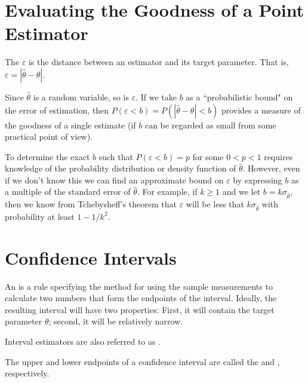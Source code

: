 \documentclass[12pt, a4paper, twoside, openright, titlepage]{book}
\begin{document}
\section{\textsection Evaluating the Goodness of a Point Estimator}

\begin{defn}{}{}
    The  $\varepsilon$ is the distance between an estimator and its target parameter. That is, $\varepsilon = |\hat{\theta} - \theta|$.
\end{defn}

Since $\hat{\theta}$ is a random variable, so is $\varepsilon$. If we take $b$ as a ``probabilistic bound" on the error of estimation, then $P(\varepsilon < b) = P(|\hat{\theta} - \theta| < b)$ provides a measure of the goodness of a single estimate (if $b$ can be regarded as small from some practical point of view).

To determine the exact $b$ such that $P(\varepsilon < b) = p$ for some $0 < p < 1$ requires knowledge of the probability distribution or density function of $\hat{\theta}$. However, even if we don't know this we can find an approximate bound on $\varepsilon$ by expressing $b$ as a multiple of the standard error of $\hat{\theta}$. For example, if $k \geq 1$ and we let $b = k\sigma_{\hat{\theta}}$, then we know from Tchebysheff's theorem that $\varepsilon$ will be less that $k\sigma_{\hat{\theta}}$ with probability at least $1 - 1/k^2$.

\section{\textsection Confidence Intervals}

\begin{defn}{}{}
    An  is a rule specifying the method for using the sample measurements to calculate two numbers that form the endpoints of the interval. Ideally, the resulting interval will have two properties: First, it will contain the target parameter $\theta$; second, it will be relatively narrow.

    Interval estimators are also referred to as .
\end{defn}


\begin{defn}{}{}
    The upper and lower endpoints of a confidence interval are called the  and , respectively.
\end{defn}
\end{document}
